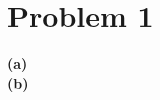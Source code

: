 \documentclass{article}
\begin{document}
\large 
\linespread{1.5}


\section*{Problem 1}
\textbf{(a)} %
\\
\textbf{(b)} %
\end{document}
